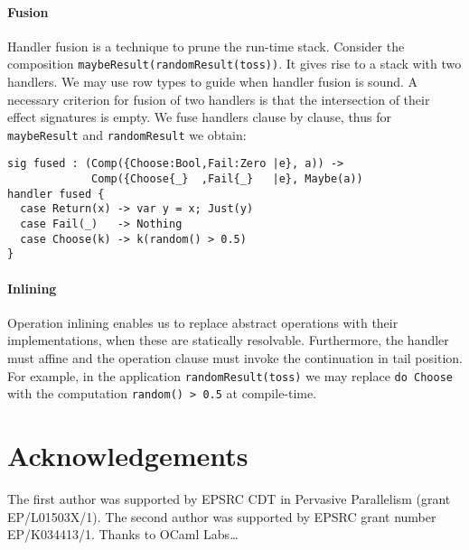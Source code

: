 \documentclass[preprint,numbers]{sigplanconf}
\begin{document}
\paragraph{Fusion} Handler fusion is a technique to prune the run-time
stack. Consider the composition
\lstinline$maybeResult(randomResult(toss))$. It gives
rise to a stack with two handlers.  We may use row types to guide when
handler fusion is sound. A necessary criterion for fusion of two
handlers is that the intersection of their effect signatures is
empty. We fuse handlers clause by clause, thus for
\lstinline$maybeResult$ and \lstinline$randomResult$ we obtain:
\begin{lstlisting}
sig fused : (Comp({Choose:Bool,Fail:Zero |e}, a)) ->
             Comp({Choose{_}  ,Fail{_}   |e}, Maybe(a))
handler fused {
  case Return(x) -> var y = x; Just(y)
  case Fail(_)   -> Nothing
  case Choose(k) -> k(random() > 0.5)
}
\end{lstlisting}

\paragraph{Inlining} Operation inlining enables us to replace abstract
operations with their implementations, when these are statically
resolvable. Furthermore, the handler must affine and the operation
clause must invoke the continuation in tail position. For example, in
the application \lstinline$randomResult(toss)$ we may replace
\lstinline$do Choose$ with the computation \lstinline$random() > 0.5$ at compile-time.

\section{Acknowledgements}
The first author was supported by EPSRC CDT in Pervasive Parallelism
(grant EP/L01503X/1).  The second author was supported by EPSRC grant
number EP/K034413/1.  Thanks to OCaml Labs\dots

 \softraggedright

\end{document}
